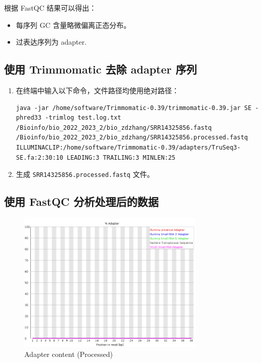 \documentclass[UTF8]{ctexart}
\begin{document}
\clearpage

根据 FastQC 结果可以得出：
\begin{itemize}
	\item 每序列 GC 含量略微偏离正态分布。
	\item 过表达序列为 adapter.
\end{itemize}

\subsection{ 使用 Trimmomatic 去除 adapter 序列}

\begin{enumerate}
	\item 在终端中输入以下命令，文件路径均使用绝对路径：
	\begin{lstlisting}
java -jar /home/software/Trimmomatic-0.39/trimmomatic-0.39.jar SE -phred33 -trimlog test.log.txt /Bioinfo/bio_2022_2023_2/bio_zdzhang/SRR14325856.fastq /Bioinfo/bio_2022_2023_2/bio_zdzhang/SRR14325856.processed.fastq ILLUMINACLIP:/home/software/Trimmomatic-0.39/adapters/TruSeq3-SE.fa:2:30:10 LEADING:3 TRAILING:3 MINLEN:25 
	\end{lstlisting}
	\item 生成 \verb|SRR14325856.processed.fastq| 文件。
\end{enumerate}

\subsection{使用 FastQC 分析处理后的数据}

\begin{figure}[!htb]
	\centering
	\includegraphics[width=0.8\textwidth]{img/SRR14325859_FastQC_Processed_img/adapter_content.png}	%
	\caption{Adapter content (Processed)\protect}    %
\end{figure}
\end{document}

